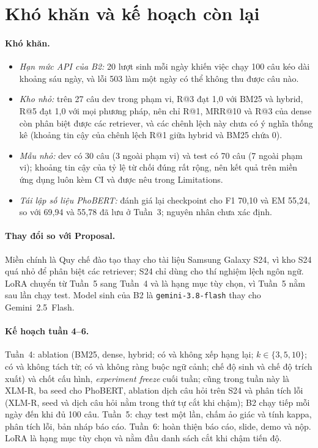 \section{Khó khăn và kế hoạch còn lại}
\label{sec:plan}

\paragraph{Khó khăn.}
\begin{itemize}
\item \emph{Hạn mức API của B2:} 20 lượt sinh mỗi ngày khiến việc chạy 100 câu kéo dài khoảng sáu ngày, và lỗi 503 làm một ngày có thể không thu được câu nào.
\item \emph{Kho nhỏ:} trên 27 câu dev trong phạm vi, R@3 đạt 1,0 với BM25 và hybrid, R@5 đạt 1,0 với mọi phương pháp, nên chỉ R@1, MRR@10 và R@3 của dense còn phân biệt được các retriever, và các chênh lệch này chưa có ý nghĩa thống kê (khoảng tin cậy của chênh lệch R@1 giữa hybrid và BM25 chứa 0).
\item \emph{Mẫu nhỏ:} dev có 30 câu (3 ngoài phạm vi) và test có 70 câu (7 ngoài phạm vi); khoảng tin cậy của tỷ lệ từ chối đúng rất rộng, nên kết quả trên miền ứng dụng luôn kèm CI và được nêu trong Limitations.
\item \emph{Tái lập số liệu PhoBERT:} đánh giá lại checkpoint cho F1 70,10 và EM 55,24, so với 69,94 và 55,78 đã lưu ở Tuần~3; nguyên nhân chưa xác định.
\end{itemize}

\paragraph{Thay đổi so với Proposal.} Miền chính là Quy chế đào tạo thay cho tài liệu Samsung Galaxy S24, vì kho S24 quá nhỏ để phân biệt các retriever; S24 chỉ dùng cho thí nghiệm lệch ngôn ngữ. LoRA \citep{hu2022lora} chuyển từ Tuần~5 sang Tuần~4 và là hạng mục tùy chọn, vì Tuần~5 nằm sau lần chạy test. Model sinh của B2 là \texttt{gemini-3.8-flash} thay cho Gemini~2.5~Flash.

\paragraph{Kế hoạch tuần 4--6.} Tuần~4: ablation (BM25, dense, hybrid; có và không xếp hạng lại; $k \in \{3,5,10\}$; có và không tách từ; có và không ràng buộc ngữ cảnh; chế độ sinh và chế độ trích xuất) và chốt cấu hình, \emph{experiment freeze} cuối tuần; cũng trong tuần này là XLM-R, ba seed cho PhoBERT, ablation dịch câu hỏi trên S24 và phân tích lỗi (XLM-R, seed và dịch câu hỏi nằm trong thứ tự cắt khi chậm); B2 chạy tiếp mỗi ngày đến khi đủ 100 câu. Tuần~5: chạy test một lần, chấm ảo giác và tính kappa, phân tích lỗi, bản nháp báo cáo. Tuần~6: hoàn thiện báo cáo, slide, demo và nộp. LoRA là hạng mục tùy chọn và nằm đầu danh sách cắt khi chậm tiến độ.
